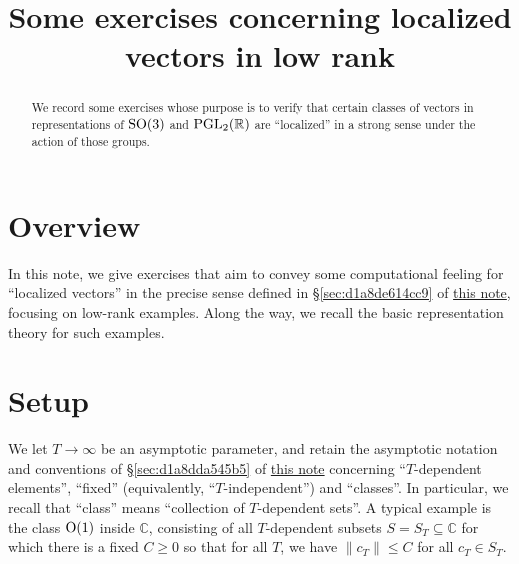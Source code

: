 \documentclass[reqno]{amsart} 
\title{Some exercises concerning localized vectors in low rank}
\numberwithin{equation}{section}
\begin{document}
\maketitle
\tableofcontents


\begin{abstract}
We record some exercises whose purpose is to verify that certain classes of vectors in representations of $\operatorname{SO}(3)$ and $\operatorname{PGL}_2(\mathbb{R})$ are ``localized'' in a strong sense under the action of those groups.  
\end{abstract}

\section{Overview}\label{sec:d1a9162ede03}

In this note, we give exercises that aim to convey some computational feeling for ``localized vectors'' in the precise sense defined in \S\ref{sec:d1a8de614cc9} of \href{20230522T150333__microlocal-localized-vectors.pdf}{this note}, focusing on low-rank examples.  Along the way, we recall the basic representation theory for such examples.

\section{Setup}\label{sec:d1a94d0b364d}
We let $T \rightarrow \infty$ be an asymptotic parameter, and retain the asymptotic notation and conventions of \S\ref{sec:d1a8dda545b5} of \href{20230522T150333__microlocal-localized-vectors.pdf}{this note} concerning ``$T$-dependent elements'', ``fixed'' (equivalently, ``$T$-independent'') and ``classes''.  In particular, we recall that ``class'' means ``collection of $T$-dependent sets''.  A typical example is the class $\operatorname{O}(1)$ inside $\mathbb{C}$, consisting of all $T$-dependent subsets $S = S_T \subseteq \mathbb{C}$ for which there is a fixed $C \geq 0$ so that for all $T$, we have $\lVert c_T \rVert \leq C$ for all $c_T \in S_T$.
\end{document}
